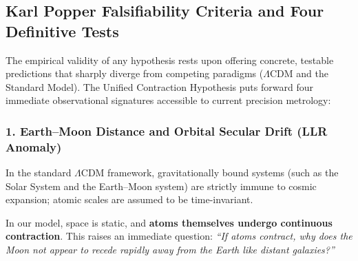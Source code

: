 \subsection{Karl Popper Falsifiability Criteria and Four Definitive Tests}
\label{sec:yanlislanabilirlik_testleri}

The empirical validity of any hypothesis rests upon offering concrete, testable predictions that sharply diverge from competing paradigms ($\Lambda$CDM and the Standard Model). The Unified Contraction Hypothesis puts forward four immediate observational signatures accessible to current precision metrology:

\subsubsection{1. Earth--Moon Distance and Orbital Secular Drift (LLR Anomaly)}
In the standard $\Lambda$CDM framework, gravitationally bound systems (such as the Solar System and the Earth--Moon system) are strictly immune to cosmic expansion; atomic scales are assumed to be time-invariant.

In our model, space is static, and \textbf{atoms themselves undergo continuous contraction}. This raises an immediate question: \textit{``If atoms contract, why does the Moon not appear to recede rapidly away from the Earth like distant galaxies?''}

